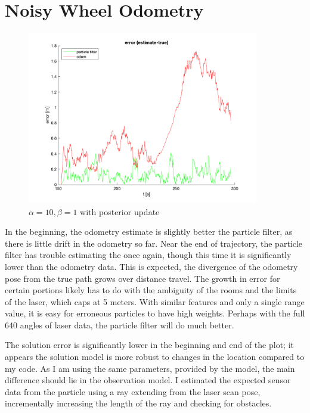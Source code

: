 \documentclass{article} %
\begin{document}
\section{Noisy Wheel Odometry} 
\begin{figure}[hbt]
  \centering
    \includegraphics[width=0.9\textwidth]{ass2_q2.png}
  \caption{$\alpha = 10, \beta = 1$ with posterior update}
\end{figure}

In the beginning, the odometry estimate is slightly better the particle filter, as there is little drift in the odometry so far. Near the end of trajectory, the particle filter has trouble estimating the once again, though this time it is significantly lower than the odometry data. This is expected, the divergence of the odometry pose from the true path grows over distance travel.
The growth in error for certain portions likely has to do with the ambiguity of the rooms and the limits of the laser, which caps at 5 meters. With similar features and only a single range value, it is easy for erroneous particles to have high weights. Perhaps with the full 640 angles of laser data, the particle filter will do much better.

The solution error is significantly lower in the beginning and end of the plot; it appears the solution model is more robust to changes in the location compared to my code.
As I am using the same parameters, provided by the model, the main difference should lie in the observation model. I estimated the expected sensor data from the particle using a ray extending from the laser scan pose, incrementally increasing the length of the ray and checking for obstacles.
\end{document}
